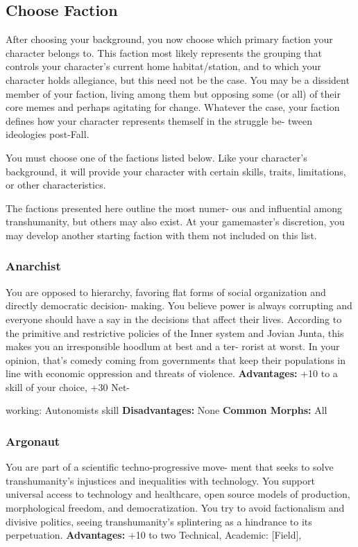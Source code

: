 \subsection{Choose Faction}

After choosing your background, you now choose 
which primary faction your character belongs to. 
This faction most likely represents the grouping that 
controls your character's current home habitat/station, 
and to which your character holds allegiance, but this 
need not be the case. You may be a dissident member 
of your faction, living among them but opposing some 
(or all) of their core memes and perhaps agitating for 
change. Whatever the case, your faction defines how 
your character represents themself in the struggle be-
tween ideologies post-Fall.

You must choose one of the factions listed below. 
Like your character's background, it will provide your 
character with certain skills, traits, limitations, or 
other characteristics.

The factions presented here outline the most numer-
ous and influential among transhumanity, but others 
may also exist. At your gamemaster's discretion, you 
may develop another starting faction with them not 
included on this list.

\subsubsection{Anarchist}

You are opposed to hierarchy, favoring flat forms of 
social organization and directly democratic decision-
making. You believe power is always corrupting and 
everyone should have a say in the decisions that affect 
their lives. According to the primitive and restrictive 
policies of the Inner system and Jovian Junta, this 
makes you an irresponsible hoodlum at best and a ter-
rorist at worst. In your opinion, that's comedy coming 
from governments that keep their populations in line 
with economic oppression and threats of violence.
\textbf{Advantages:} +10 to a skill of your choice, +30 Net-

working: Autonomists skill
\textbf{Disadvantages:} None
\textbf{Common Morphs:} All

\subsubsection{Argonaut}

You are part of a scientific techno-progressive move-
ment that seeks to solve transhumanity's injustices and 
inequalities with technology. You support universal 
access to technology and healthcare, open source 
models of production, morphological freedom, and 
democratization. You try to avoid factionalism and 
divisive politics, seeing transhumanity's splintering as 
a hindrance to its perpetuation.
\textbf{Advantages:} +10 to two Technical, Academic: [Field], 

